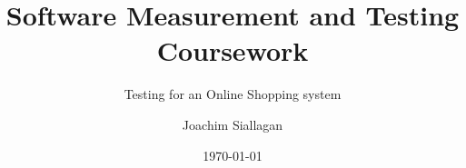 \documentclass[a4paper, 12pt]{report}
\title{Software Measurement and Testing Coursework}
\subtitle{Testing for an Online Shopping system }%
\author{Joachim Siallagan}\\   %
\date{\today}
\begin{document}
    \maketitle
    \romantableofcontents

    
    
    
    
    

    \appendix
\end{document}
